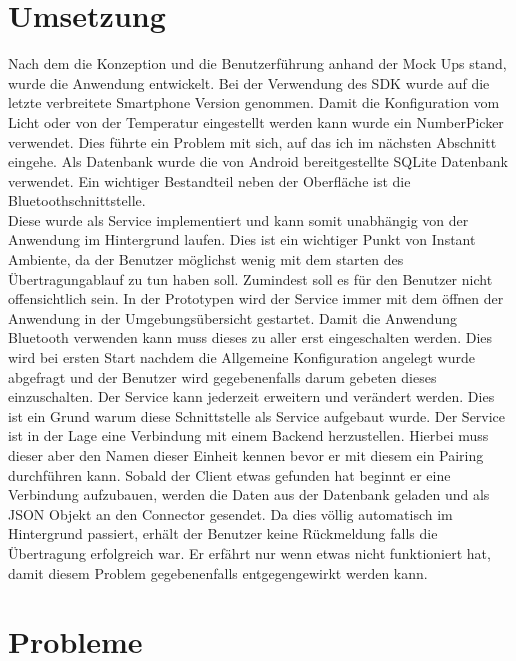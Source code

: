 \section{Umsetzung} 
Nach dem die Konzeption und die Benutzerführung anhand der Mock Ups stand, wurde die Anwendung entwickelt. Bei der Verwendung des SDK wurde auf die letzte verbreitete Smartphone Version genommen. Damit die Konfiguration vom Licht oder von der Temperatur eingestellt werden kann wurde ein NumberPicker verwendet. Dies führte ein Problem mit sich, auf das ich im nächsten Abschnitt eingehe. Als Datenbank wurde die von Android bereitgestellte SQLite Datenbank verwendet. Ein wichtiger Bestandteil neben der Oberfläche ist die Bluetoothschnittstelle. \\
Diese wurde als Service implementiert und kann somit unabhängig von der Anwendung im Hintergrund laufen. Dies ist ein wichtiger Punkt von Instant Ambiente, da der Benutzer möglichst wenig mit dem starten des Übertragungablauf zu tun haben soll. Zumindest soll es für den Benutzer nicht offensichtlich sein. In der Prototypen wird der Service immer mit dem öffnen der Anwendung in der Umgebungsübersicht gestartet. Damit die Anwendung Bluetooth verwenden kann muss dieses zu aller erst eingeschalten werden. Dies wird bei ersten Start nachdem die Allgemeine Konfiguration angelegt wurde abgefragt und der Benutzer wird gegebenenfalls darum gebeten dieses einzuschalten. Der Service kann jederzeit erweitern und verändert werden. Dies ist ein Grund warum diese Schnittstelle als Service aufgebaut wurde. Der Service ist in der Lage eine Verbindung mit einem Backend herzustellen. Hierbei muss dieser aber den Namen dieser Einheit kennen bevor er mit diesem ein Pairing durchführen kann. Sobald der Client etwas gefunden hat beginnt er eine Verbindung aufzubauen, werden die Daten aus der Datenbank geladen und als JSON Objekt an den Connector gesendet. Da dies völlig automatisch im Hintergrund passiert, erhält der Benutzer keine Rückmeldung falls die Übertragung erfolgreich war. Er erfährt nur wenn etwas nicht funktioniert hat, damit diesem Problem gegebenenfalls entgegengewirkt werden kann.         

\section{Probleme}

